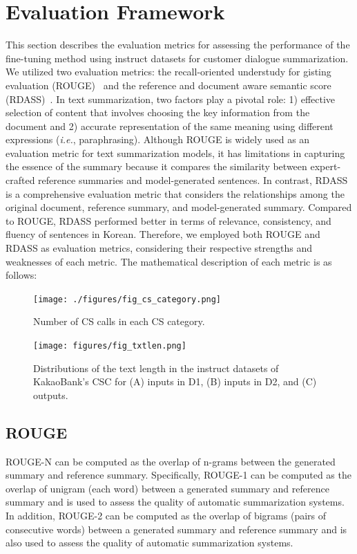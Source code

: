\documentclass[sigconf]{acmart}
\begin{document}
\section{Evaluation Framework}\label{evaluation_metrics}
This section describes the evaluation metrics for assessing the performance of the fine-tuning method using instruct datasets for customer dialogue summarization. We utilized two evaluation metrics: the recall-oriented understudy for gisting evaluation (ROUGE)~\cite{lin2004rouge, ganesan2018rouge} and the reference and document aware semantic score (RDASS)~\cite{lee2020rdass}. In text summarization, two factors play a pivotal role: 1) effective selection of content that involves choosing the key information from the document and 2) accurate representation of the same meaning using different expressions ({\it i.e.}, paraphrasing). Although ROUGE is widely used as an evaluation metric for text summarization models, it has limitations in capturing the essence of the summary because it compares the similarity between expert-crafted reference summaries and model-generated sentences. In contrast, RDASS is a comprehensive evaluation metric that considers the relationships among the original document, reference summary, and model-generated summary. Compared to ROUGE, RDASS performed better in terms of relevance, consistency, and fluency of sentences in Korean. Therefore, we employed both ROUGE and RDASS as evaluation metrics, considering their respective strengths and weaknesses of each metric. The mathematical description of each metric is as follows:


\begin{figure}[t!]
  \centering
  \texttt{[image: ./figures/fig\_cs\_category.png]}
  \caption{Number of CS calls in each CS category. 
  }
\label{fig_cs_category}
\end{figure}



\begin{figure}[t!]
  \centering
  \texttt{[image: figures/fig\_txtlen.png]}
  \caption{Distributions of the text length in the instruct datasets of KakaoBank's CSC for (A) inputs in D1, (B) inputs in D2, and (C) outputs.
  }
\label{fig_txtlen}
\end{figure}


\subsection{ROUGE} 
ROUGE-N can be computed as the overlap of n-grams between the generated summary and reference summary. Specifically, ROUGE-1 can be computed as the overlap of unigram (each word) between a generated summary and reference summary and is used to assess the quality of automatic summarization systems. In addition, ROUGE-2 can be computed as the overlap of bigrams (pairs of consecutive words) between a generated summary and reference summary and is also used to assess the quality of automatic summarization systems.
\end{document}
